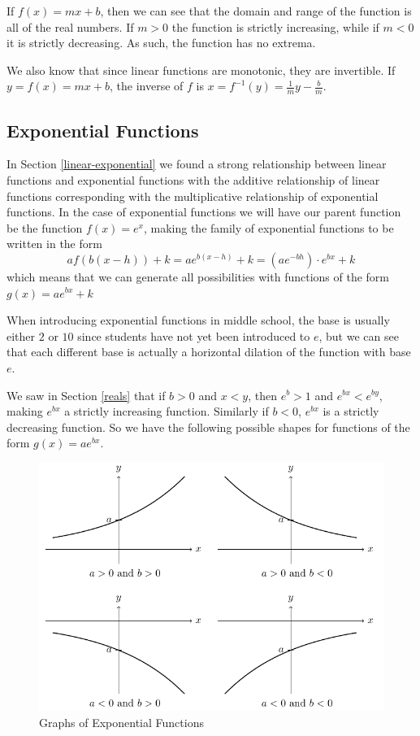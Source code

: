 \documentclass[
]{book}
\theoremstyle{definition}
\theoremstyle{definition}
\theoremstyle{definition}
\theoremstyle{definition}
\theoremstyle{remark}
\begin{document}
If \(f(x)=mx+b\), then we can see that the domain and range of the function is all of the real numbers. If \(m>0\) the function is strictly increasing, while if \(m<0\) it is strictly decreasing. As such, the function has no extrema.

We also know that since linear functions are monotonic, they are invertible. If \(y=f(x)=mx+b\), the inverse of \(f\) is \(x=f^{-1}(y)= \frac{1}{m} y-\frac{b}{m}\).

\hypertarget{exponential-functions}{%
\subsection{Exponential Functions}\label{exponential-functions}}

In Section \ref{linear-exponential} we found a strong relationship between linear functions and exponential functions with the additive relationship of linear functions corresponding with the multiplicative relationship of exponential functions. In the case of exponential functions we will have our parent function be the function \(f(x)=e^x\), making the family of exponential functions to be written in the form \[a f(b(x-h))+k = a e^{b(x-h)}+k = (ae^{-bh}) \cdot e^{bx} +k\] which means that we can generate all possibilities with functions of the form
\(g(x)=a e^{bx} + k\)

When introducing exponential functions in middle school, the base is usually either \(2\) or \(10\) since students have not yet been introduced to \(e\), but we can see that each different base is actually a horizontal dilation of the function with base \(e\).

We saw in Section \ref{reals} that if \(b>0\) and \(x<y\), then \(e^b>1\) and \(e^{bx}<e^{by}\), making \(e^{bx}\) a strictly increasing function. Similarly if \(b<0\), \(e^{bx}\) is a strictly decreasing function. So we have the following possible shapes for functions of the form \(g(x)=ae^{bx}\).

\begin{figure}

{\centering \includegraphics[width=0.9\linewidth]{tikz/exp5} 

}

\caption{Graphs of Exponential Functions}\label{fig:unnamed-chunk-68}
\end{figure}
\end{document}
